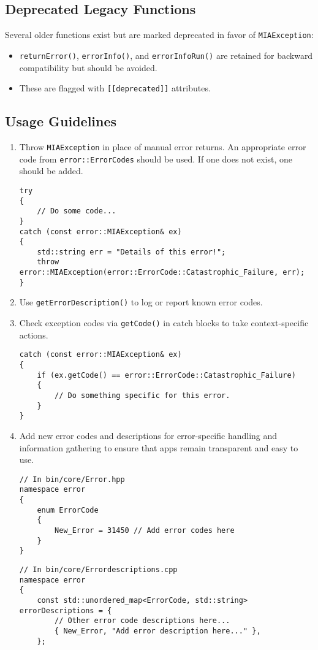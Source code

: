 \subsection*{Deprecated Legacy Functions}
Several older functions exist but are marked deprecated in favor of \texttt{MIAException}:
\begin{itemize}
	\item \texttt{returnError()}, \texttt{errorInfo()}, and \texttt{errorInfoRun()} are retained for backward compatibility but should be avoided.
	\item These are flagged with \texttt{[[deprecated]]} attributes.
\end{itemize}

\subsection*{Usage Guidelines}
\begin{enumerate}
	\item Throw \texttt{MIAException} in place of manual error returns. An appropriate error code from \texttt{error::ErrorCodes} should be used. If one does not exist, one should be added.
	\begin{lstlisting}[style=cppstyle]
try
{    
    // Do some code...
}
catch (const error::MIAException& ex)
{
    std::string err = "Details of this error!";
    throw error::MIAException(error::ErrorCode::Catastrophic_Failure, err); 
}
	\end{lstlisting}
	\item Use \texttt{getErrorDescription()} to log or report known error codes.
	\item Check exception codes via \texttt{getCode()} in catch blocks to take context-specific actions.
	\begin{lstlisting}[style=cppstyle]
catch (const error::MIAException& ex)
{
    if (ex.getCode() == error::ErrorCode::Catastrophic_Failure)
    {
    	// Do something specific for this error.
    }
}
	\end{lstlisting}
	\item Add new error codes and descriptions for error-specific handling and information gathering to ensure that apps remain transparent and easy to use.
	\begin{lstlisting}[style=cppstyle]
// In bin/core/Error.hpp
namespace error
{
    enum ErrorCode
    {
    	New_Error = 31450 // Add error codes here
    }
}
	\end{lstlisting}
	\begin{lstlisting}[style=cppstyle]
// In bin/core/Errordescriptions.cpp
namespace error
{
    const std::unordered_map<ErrorCode, std::string> errorDescriptions = {
    	// Other error code descriptions here...
        { New_Error, "Add error description here..." },
    };
	\end{lstlisting}
\end{enumerate}

